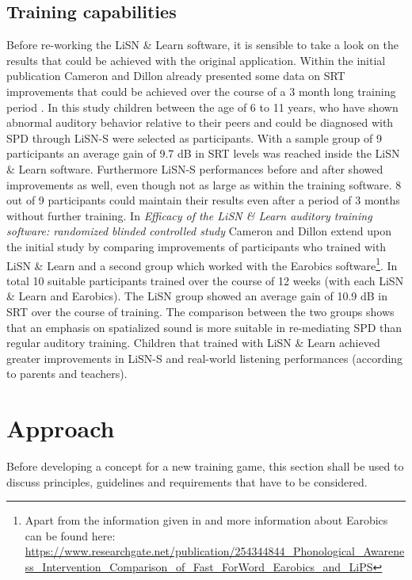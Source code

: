 \documentclass[a4paper,11pt]{article}%
\renewcommand{\\}{\vspace*{0.5\baselineskip} \newline}
\begin{document}
\subsection{Training capabilities}
Before re-working the \ac{LiSN} \& Learn software, it is sensible to take a look on the results that could be achieved with the original application. Within the initial publication Cameron and Dillon already presented some data on \ac{SRT} improvements that could be achieved over the course of a 3 month long training period \cite{LiSN-A}. In this study children between the age of 6 to 11 years, who have shown \dq abnormal auditory behavior relative to their peers\dq{} and could be diagnosed with \ac{SPD} through \ac{LiSN-S} were selected as participants. With a sample group of 9 participants an average gain of 9.7 dB in \ac{SRT} levels was reached inside the \ac{LiSN} \& Learn software. Furthermore \ac{LiSN-S} performances before and after showed improvements as well, even though not as large as within the training software. 8 out of 9 participants could maintain their results even after a period of 3 months without further training.
\newline
\newline
In \textit{Efficacy of the LiSN \& Learn auditory training software: randomized blinded controlled study} \cite{LiSN-B} Cameron and Dillon extend upon the initial study by comparing improvements of participants who trained with \ac{LiSN} \& Learn and a second group which worked with the Earobics software\footnote{Apart from the information given in \cite{LiSN-A} and \cite{LiSB-B} more information about Earobics can be found here: \url{https://www.researchgate.net/publication/254344844_Phonological_Awareness_Intervention_Comparison_of_Fast_ForWord_Earobics_and_LiPS}}. In total 10 suitable participants trained over the course of 12 weeks (with each \ac{LiSN} \& Learn and Earobics). The \ac{LiSN} group showed an average gain of 10.9 dB in \ac{SRT} over the course of training. The comparison between the two groups shows that an emphasis on spatialized sound is more suitable in re-mediating \ac{SPD} than regular auditory training. Children that trained with \ac{LiSN} \& Learn achieved greater improvements in \ac{LiSN-S} and real-world listening performances (according to parents and teachers).


\section{Approach}
\label{sec:approach}
Before developing a concept for a new training game, this section shall be used to discuss principles, guidelines and requirements that have to be considered.
\end{document}
